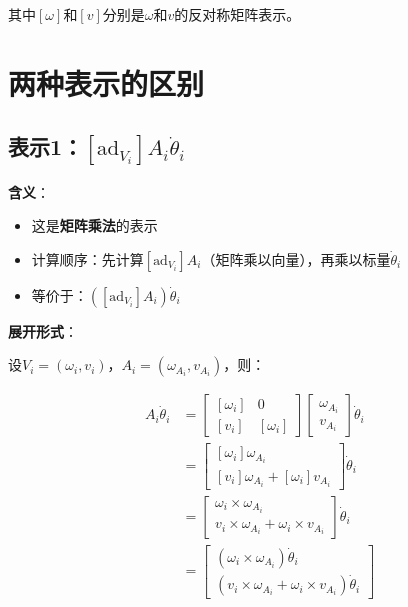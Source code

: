 \documentclass[12pt,a4paper]{article}
\begin{document}
其中$[\omega]$和$[v]$分别是$\omega$和$v$的反对称矩阵表示。

\section{两种表示的区别}

\subsection{表示1：$[\text{ad}_{V_i}] A_i \dot{\theta}_i$}

\textbf{含义}：
\begin{itemize}
\item 这是\textbf{矩阵乘法}的表示
\item 计算顺序：先计算$[\text{ad}_{V_i}] A_i$（矩阵乘以向量），再乘以标量$\dot{\theta}_i$
\item 等价于：$( [\text{ad}_{V_i}] A_i ) \dot{\theta}_i$
\end{itemize}

\textbf{展开形式}：

设$V_i = (\omega_i, v_i)$，$A_i = (\omega_{A_i}, v_{A_i})$，则：

\begin{align}
[\text{ad}_{V_i}] A_i \dot{\theta}_i &= \begin{bmatrix}
[\omega_i] & 0 \\
[v_i] & [\omega_i]
\end{bmatrix} \begin{bmatrix}
\omega_{A_i} \\
v_{A_i}
\end{bmatrix} \dot{\theta}_i \\
&= \begin{bmatrix}
[\omega_i] \omega_{A_i} \\
[v_i] \omega_{A_i} + [\omega_i] v_{A_i}
\end{bmatrix} \dot{\theta}_i \\
&= \begin{bmatrix}
\omega_i \times \omega_{A_i} \\
v_i \times \omega_{A_i} + \omega_i \times v_{A_i}
\end{bmatrix} \dot{\theta}_i \\
&= \begin{bmatrix}
(\omega_i \times \omega_{A_i}) \dot{\theta}_i \\
(v_i \times \omega_{A_i} + \omega_i \times v_{A_i}) \dot{\theta}_i
\end{bmatrix}
\label{eq:notation1_expanded}
\end{align}
\end{document}
